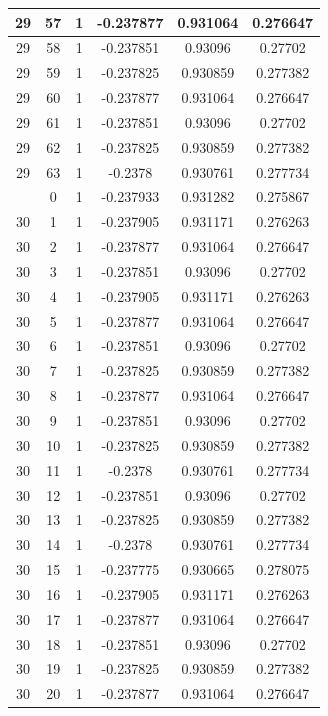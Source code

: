 \documentclass[12pt,a4paper]{article}
\numberwithin{equation}{section}
\numberwithin{figure}{section}
\numberwithin{table}{section}
\begin{document}
\begin{longtable}{|c|c|c|c|c|c|}
29 & 57 & 1 & -0.237877 & 0.931064 & 0.276647 \\ \hline
29 & 58 & 1 & -0.237851 & 0.93096 & 0.27702 \\ \hline
29 & 59 & 1 & -0.237825 & 0.930859 & 0.277382 \\ \hline
29 & 60 & 1 & -0.237877 & 0.931064 & 0.276647 \\ \hline
29 & 61 & 1 & -0.237851 & 0.93096 & 0.27702 \\ \hline
29 & 62 & 1 & -0.237825 & 0.930859 & 0.277382 \\ \hline
29 & 63 & 1 & -0.2378 & 0.930761 & 0.277734 \\ \hline
\pagebreak
30 & 0 & 1 & -0.237933 & 0.931282 & 0.275867 \\ \hline
30 & 1 & 1 & -0.237905 & 0.931171 & 0.276263 \\ \hline
30 & 2 & 1 & -0.237877 & 0.931064 & 0.276647 \\ \hline
30 & 3 & 1 & -0.237851 & 0.93096 & 0.27702 \\ \hline
30 & 4 & 1 & -0.237905 & 0.931171 & 0.276263 \\ \hline
30 & 5 & 1 & -0.237877 & 0.931064 & 0.276647 \\ \hline
30 & 6 & 1 & -0.237851 & 0.93096 & 0.27702 \\ \hline
30 & 7 & 1 & -0.237825 & 0.930859 & 0.277382 \\ \hline
30 & 8 & 1 & -0.237877 & 0.931064 & 0.276647 \\ \hline
30 & 9 & 1 & -0.237851 & 0.93096 & 0.27702 \\ \hline
30 & 10 & 1 & -0.237825 & 0.930859 & 0.277382 \\ \hline
30 & 11 & 1 & -0.2378 & 0.930761 & 0.277734 \\ \hline
30 & 12 & 1 & -0.237851 & 0.93096 & 0.27702 \\ \hline
30 & 13 & 1 & -0.237825 & 0.930859 & 0.277382 \\ \hline
30 & 14 & 1 & -0.2378 & 0.930761 & 0.277734 \\ \hline
30 & 15 & 1 & -0.237775 & 0.930665 & 0.278075 \\ \hline
30 & 16 & 1 & -0.237905 & 0.931171 & 0.276263 \\ \hline
30 & 17 & 1 & -0.237877 & 0.931064 & 0.276647 \\ \hline
30 & 18 & 1 & -0.237851 & 0.93096 & 0.27702 \\ \hline
30 & 19 & 1 & -0.237825 & 0.930859 & 0.277382 \\ \hline
30 & 20 & 1 & -0.237877 & 0.931064 & 0.276647 \\ \hline

\end{longtable}
\end{document}
